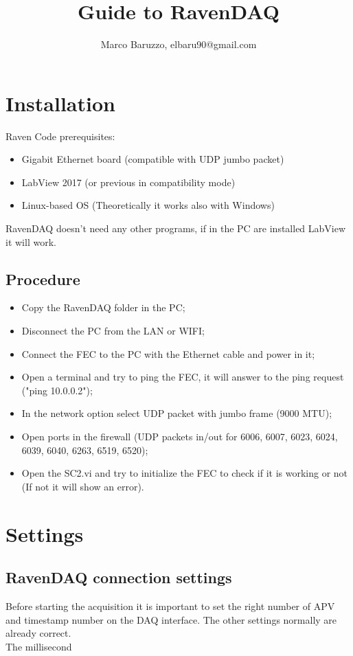 \documentclass[a4paper,12pt]{article}
\title{Guide to RavenDAQ}
\author{Marco Baruzzo, elbaru90@gmail.com}
\begin{document}
	\maketitle

	\titlepage

	\tableofcontents
	\newpage

	\section{Installation}
		Raven Code prerequisites:
		\begin{itemize}
			\item Gigabit Ethernet board (compatible with UDP jumbo packet)
			\item LabView 2017 (or previous in compatibility mode)
			\item Linux-based OS (Theoretically it works also with Windows)
		\end{itemize}
		RavenDAQ doesn't need any other programs, if in the PC are installed LabView it will work.

		\subsection{Procedure}
		\begin{itemize}
			\item Copy the RavenDAQ folder in the PC;
			\item Disconnect the PC from the LAN or WIFI;
			\item Connect the FEC to the PC with the Ethernet cable and power in it;
			\item Open a terminal and try to ping the FEC, it will answer to the ping request ("ping 10.0.0.2");
			\item In the network option select UDP packet with jumbo frame (9000 MTU);
			\item Open ports in the firewall (UDP packets in/out for 6006, 6007, 6023, 6024, 6039, 6040, 6263, 6519, 6520);
			\item Open the SC2.vi and try to initialize the FEC to check if it is working or not (If not it will show an error).
		\end{itemize}



	\section{Settings}
		\subsection{RavenDAQ connection settings} 
			Before starting the acquisition it is important to set the right number of APV and timestamp number on the DAQ interface. The other settings normally are already correct. \\
			The millisecond 
\end{document}
